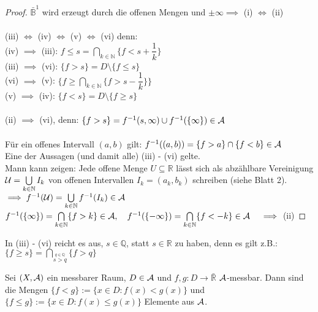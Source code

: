 \documentclass[11pt,a4paper,fleqn,openany]{report}
\begin{document}
    \begin{proof}
      $\bar{\mathbb{B}}^1$ wird erzeugt durch die offenen Mengen und $\pm \infty \implies$ (i) $\Leftrightarrow$ (ii)\\
      \\
      (iii) $\Leftrightarrow$ (iv) $\Leftrightarrow$ (v) $\Leftrightarrow$ (vi) denn:\\
      (iv) $\implies$ (iii): ${f \leq s} = \bigcap\limits_{k \in \mathbb{N}} \{f < s + \dfrac{1}{k}\}$\\
      (iii) $\implies$ (vi): $\{f > s\} = D \setminus \{f \leq s\}$\\
      (vi) $\implies$ (v): $\{f \geq \bigcap\limits_{k \in \mathbb{N}} \{f > s - \dfrac{1}{k}\}\}$\\
      (v) $\implies$ (iv): $\{f < s\} = D \setminus \{f \geq s\}$\\
      \\
      (ii) $\implies$ (vi), denn: $\{f > s\} = f^{-1}(s,\infty) \cup f^{-1}(\{\infty\}) \in \mathcal{A}$\\
      \\
      Für ein offenes Intervall $(a,b)$ gilt: $f^{-1}((a,b)) = \{f > a\} \cap \{f < b\} \in \mathcal{A}$\\
      Eine der Aussagen (und damit alle) (iii) - (vi) gelte.\\
      Mann kann zeigen: Jede offene Menge $U \subseteq \mathbb{R}$ lässt sich als abzählbare Vereinigung $\mathcal{U} = \bigcup\limits_{k \in \mathbb{N}} I_k$ von offenen Intervallen $I_k = (a_k, b_k)$ schreiben (siehe Blatt 2).\\
      $\implies f^{-1}(\mathcal{U}) = \bigcup\limits_{k \in \mathbb{N}} f^{-1}(I_k) \in \mathcal{A}$\\
      $f^{-1}(\{\infty\}) = \bigcap\limits_{k \in \mathbb{N}} \{f > k\} \in \script{A}, \ \ \ f^{-1}(\{-\infty\}) = \bigcap\limits_{k \in \mathbb{N}} \{f < -k\} \in \script{A} \ \ \ \implies$ (ii)
    \end{proof}

    \begin{remark}
      In (iii) - (vi) reicht es aus, $s \in \mathbb{Q}$, statt $s \in \mathbb{R}$ zu haben, denn es gilt z.B.:\\
      $\{f \geq s\} = \bigcap\limits_{\stackrel{q \in \mathbb{Q}}{s > q}} \{f > q\}$
    \end{remark}


    \begin{lemma}
      Sei $(X, \mathcal{A})$ ein messbarer Raum, $D \in \mathcal{A}$ und $f,g: D \to \bar{\mathbb{R}}$ $\mathcal{A}$-messbar. Dann sind die Mengen $\{f < g\} := \{x \in D: f(x) < g(x)\}$ und $\{f \leq g\} := \{x \in D: f(x) \leq g(x)\}$ Elemente aus $\mathcal{A}$.
    \end{lemma}
\end{document}
